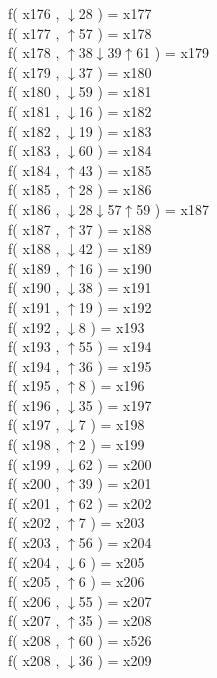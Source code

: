 f( x176 , $\downarrow$28 ) = x177 \\
f( x177 , $\uparrow$57 ) = x178 \\
f( x178 , $\uparrow$38$\downarrow$39$\uparrow$61 ) = x179 \\
f( x179 , $\downarrow$37 ) = x180 \\
f( x180 , $\downarrow$59 ) = x181 \\
f( x181 , $\downarrow$16 ) = x182 \\
f( x182 , $\downarrow$19 ) = x183 \\
f( x183 , $\downarrow$60 ) = x184 \\
f( x184 , $\uparrow$43 ) = x185 \\
f( x185 , $\uparrow$28 ) = x186 \\
f( x186 , $\downarrow$28$\downarrow$57$\uparrow$59 ) = x187 \\
f( x187 , $\uparrow$37 ) = x188 \\
f( x188 , $\downarrow$42 ) = x189 \\
f( x189 , $\uparrow$16 ) = x190 \\
f( x190 , $\downarrow$38 ) = x191 \\
f( x191 , $\uparrow$19 ) = x192 \\
f( x192 , $\downarrow$8 ) = x193 \\
f( x193 , $\uparrow$55 ) = x194 \\
f( x194 , $\uparrow$36 ) = x195 \\
f( x195 , $\uparrow$8 ) = x196 \\
f( x196 , $\downarrow$35 ) = x197 \\
f( x197 , $\downarrow$7 ) = x198 \\
f( x198 , $\uparrow$2 ) = x199 \\
f( x199 , $\downarrow$62 ) = x200 \\
f( x200 , $\uparrow$39 ) = x201 \\
f( x201 , $\uparrow$62 ) = x202 \\
f( x202 , $\uparrow$7 ) = x203 \\
f( x203 , $\uparrow$56 ) = x204 \\
f( x204 , $\downarrow$6 ) = x205 \\
f( x205 , $\uparrow$6 ) = x206 \\
f( x206 , $\downarrow$55 ) = x207 \\
f( x207 , $\uparrow$35 ) = x208 \\
f( x208 , $\uparrow$60 ) = x526 \\
f( x208 , $\downarrow$36 ) = x209 \\
